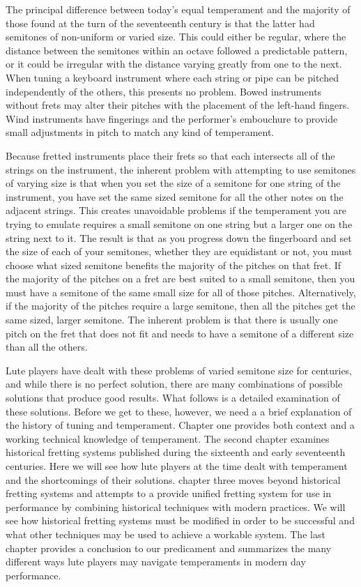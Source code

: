 The principal difference between today's equal temperament and the majority of
those found at the turn of the seventeenth century is that the latter had
semitones of non-uniform or varied size.  This could either be regular, where
the distance between the semitones within an octave followed a predictable
pattern, or it could be irregular with the distance varying greatly from one to
the next. When tuning a keyboard instrument where each string or pipe can be
pitched independently of the others, this presents no problem.  Bowed
instruments without frets may alter their pitches with the placement of the
left-hand fingers.  Wind instruments have fingerings and the performer's
embouchure to provide small adjustments in pitch to match any kind of
temperament.

Because fretted instruments place their frets so that each intersects all of the
strings on the instrument, the inherent problem with attempting to use semitones of
varying size is that when you set the size of a semitone for one string of the
instrument, you have set the same sized semitone for all the other notes on the
adjacent strings. This creates unavoidable problems if the temperament you are trying
to emulate requires a small semitone on one string but a larger one
on the string next to it. The result is that as you progress down the fingerboard and
set the size of each of your semitones, whether they are equidistant or not, you must
choose what sized semitone benefits the majority of the pitches on that fret. If the
majority of the pitches on a fret are best suited to a small semitone, then you must
have a semitone of the same small size for all of those pitches. Alternatively, if the
majority of the pitches require a large semitone, then all the pitches get the same
sized, larger semitone.  The inherent problem is that there is usually one pitch on the
fret that does not fit and needs to have a semitone of a different size than
all the others.

Lute players have dealt with these problems of varied semitone size for centuries, and
while there is no perfect solution, there are many combinations of
possible solutions that produce good results. What follows is a detailed examination
of these solutions.  Before we get to these, however, we need a a brief
explanation of the history of tuning and temperament. Chapter one provides both
context and a working technical knowledge of temperament. The second chapter
examines historical fretting systems published during the sixteenth and early
seventeenth centuries. Here we will see how lute players at the time dealt with
temperament and the shortcomings of their solutions. chapter three moves beyond
historical fretting systems and attempts to a provide unified fretting system for use
in performance by combining historical techniques with modern practices.  We will see
how historical fretting systems must be modified in order to be successful and what
other techniques may be used to achieve a workable system. The last chapter provides a
conclusion to our predicament and summarizes the many different ways lute players
may navigate temperaments in modern day performance.
